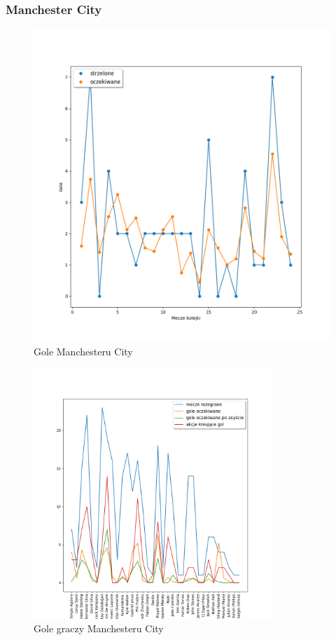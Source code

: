 \documentclass[12pt, letterpaper]{article}
\begin{document}
\subsubsection{Manchester City}
\begin{figure}[ht]
    \centering
    \includegraphics[width=.8\textwidth]{images/UCL_Manchester_goals.png}
    \caption{Gole Manchesteru City}
    \label{fig:enter-label}
\end{figure}
\pagebreak
\begin{figure}[ht]
    \centering
    \includegraphics[width=0.8\textwidth]{images/UCL_Manchester_player_goals.png}
    \caption{Gole graczy Manchesteru City}
    \label{fig:enter-label}
\end{figure}
\end{document}
